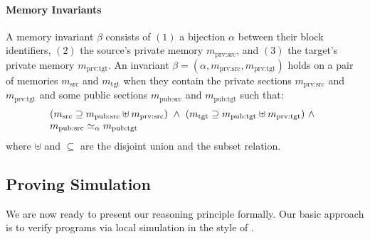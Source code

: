 \paragraph{Memory Invariants}
A memory invariant $\beta$ consists of $(1)$ a bijection $\alpha$ between their
block identifiers, $(2)$ the source's private memory
$m_\textrm{prv:src}$, and $(3)$ the target's private memory
$m_\textrm{prv:tgt}$. 
An invariant $\beta=(\alpha, m_\textrm{prv:src}, m_\textrm{prv:tgt})$ 
holds on a pair of memories $m_{\textrm{src}}$ and
$m_{\textrm{tgt}}$ when they contain the private sections $m_\textrm{prv:src}$ and 
$m_\textrm{prv:tgt}$
and some public sections $m_\textrm{pub:src}$ and
$m_\textrm{pub:tgt}$ such that:
  \[\begin{array}{@{}l}
    (m_{\textrm{src}} \supseteq m_\textrm{pub:src} \uplus m_\textrm{prv:src})~\land~
    (m_{\textrm{tgt}} \supseteq m_\textrm{pub:tgt} \uplus m_\textrm{prv:tgt})~\land\\m_{\textrm{pub:src}} \simeq_\alpha m_{\textrm{pub:tgt}}
  \end{array}\]
  where 
$\uplus$ and $\subseteq$ are the disjoint union and the subset relation.

\subsection{Proving Simulation}
\label{reasoning:simulation}

We are now ready to present our reasoning principle formally. Our
basic approach is to verify programs via local simulation in the style
of \cite{Hur:2012:MBK:2103656.2103666}.


